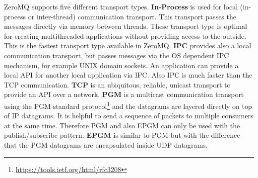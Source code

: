 ZeroMQ supports five different transport types.\newline
\textbf{In-Process} is used for local (in-process or inter-thread) communication transport.
This transport passes the messages directly via memory between threads.\autocite[cf.]{ZeroMQ:inproc}
These transport type is optimal for creating multithreaded applications without providing access to the outside.
This is the fastest transport type available in ZeroMQ.\newline
\textbf{\ac{IPC}} provides also a local communication transport, but passes messages via the \ac{OS} dependent \ac{IPC} mechanism, for example UNIX domain sockets.
An application can provide a local \ac{API} for another local application via \ac{IPC}.
Also \ac{IPC} is much faster than the \ac{TCP} communication.\newline
\textbf{\ac{TCP}} is an ubiquitous, reliable, unicast transport to provide an \ac{API} over a network.\autocite[cf.]{ZeroMQ:tcp}\newline
\textbf{\ac{PGM}} is a multicast communication transport using the \ac{PGM} standard protocol\footnote{\url{https://tools.ietf.org/html/rfc3208}} and the datagrams are layered directly on top of IP datagrams.\autocite[cf.]{ZeroMQ:pgm}
It is helpful to send a sequence of packets to multiple consumers at the same time.
Therefore \ac{PGM} and also \acs{EPGM} can only be used with the publish/subscribe pattern.\newline
\textbf{\ac{EPGM}} is similar to \ac{PGM} but with the difference that the PGM datagrams are encapsulated inside UDP datagrams.\autocite[cf.]{ZeroMQ:pgm}

